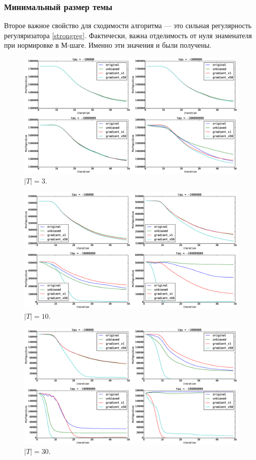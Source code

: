 \documentclass[12pt]{article}
\begin{document}
\subsubsection{Минимальный размер темы}
Второе важное свойство для сходимости алгоритма --- это сильная регулярность регуляризатора \ref{strongreg}. Фактически, важна отделимость от нуля знаменателя при нормировке в М-шаге. Именно эти значения  и были получены.
\begin{figure}[H]
	\centering
	\caption{$|T| = 3$.}    
	\includegraphics[width=1.0\linewidth]{pictures/topics_3_MinTopicSize}
\end{figure}

\begin{figure}[H]
	\centering
	\caption{$|T| = 10$.}    
	\includegraphics[width=1.0\linewidth]{pictures/topics_10_MinTopicSize}
\end{figure}

\begin{figure}[H]
	\centering
	\caption{$|T| = 30$.}    
	\includegraphics[width=1.0\linewidth]{pictures/topics_30_MinTopicSize}
\end{figure}
\end{document}
